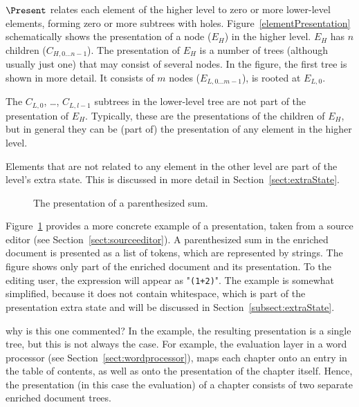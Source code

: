 $\Present$ relates each element of the higher level to zero or more lower-level elements, forming zero or more subtrees with holes.  Figure~\ref{elementPresentation} schematically shows the presentation of a node ($E_H$) in the higher level. $E_H$ has $n$ children ($C_{H,0\dots n-1}$). The presentation of $E_H$ is a number of trees (although usually just one) that may consist of several nodes. In the figure, the first tree is shown in more detail. It consists of $m$ nodes ($E_{L,0\dots m-1}$), is rooted at $E_{L,0}$. 

The $C_{L,0}$, \dots, $C_{L,l-1}$ subtrees in the lower-level tree are not part of the presentation of $E_H$. Typically, these are the presentations of the children of $E_H$, but in general they can be (part of) the presentation of any element in the higher level. 

Elements that are not related to any element in the other level are part of the level's extra state. This is discussed in more detail in Section~\ref{sect:extraState}.

\begin{figure}
\begin{center}
\begin{center}
%
%
\end{center}
\caption{The presentation of a parenthesized sum.}\label{presentExample} 
\end{center}
\end{figure}


Figure~\ref{presentExample} provides a more concrete example of a presentation, taken from a source editor (see Section~\ref{sect:sourceeditor}). A parenthesized sum in the enriched document is presented as a list of tokens, which are represented by strings.  The figure shows only part of the enriched document and its presentation. To the editing user, the expression will appear as "{\tt (1+2)}". The example is somewhat simplified, because it does not contain whitespace, which is part of the presentation extra state and will be discussed in Section~\ref{subsect:extraState}.

\bc  why is this one commented?
In the example, the resulting presentation is a single tree, but this is not always the case. For example, the evaluation layer in a word processor (see Section~\ref{sect:wordprocessor}), maps each chapter onto an entry in the table of contents, as well as onto the presentation of the chapter itself. Hence, the presentation (in this case the evaluation) of a chapter consists of two separate enriched document trees.
\ec






